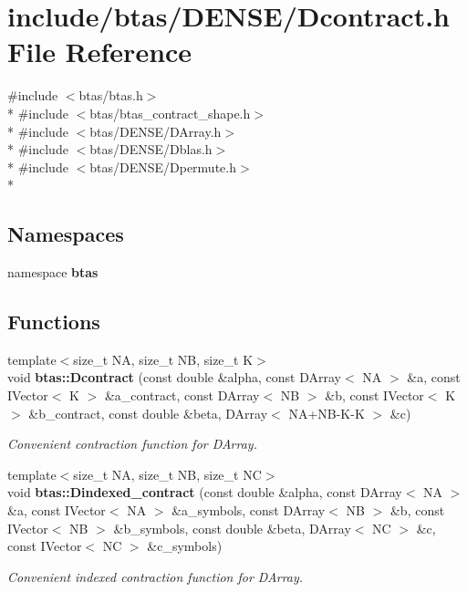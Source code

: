 \section{include/btas/\-D\-E\-N\-S\-E/\-Dcontract.h File Reference}
\label{db/da1/Dcontract_8h}
{\ttfamily \#include $<$btas/btas.\-h$>$}\\*
{\ttfamily \#include $<$btas/btas\-\_\-contract\-\_\-shape.\-h$>$}\\*
{\ttfamily \#include $<$btas/\-D\-E\-N\-S\-E/\-D\-Array.\-h$>$}\\*
{\ttfamily \#include $<$btas/\-D\-E\-N\-S\-E/\-Dblas.\-h$>$}\\*
{\ttfamily \#include $<$btas/\-D\-E\-N\-S\-E/\-Dpermute.\-h$>$}\\*
\subsection*{Namespaces}
\begin{DoxyCompactItemize}
\item 
namespace {\bf btas}
\end{DoxyCompactItemize}
\subsection*{Functions}
\begin{DoxyCompactItemize}
\item 
{\footnotesize template$<$size\-\_\-t N\-A, size\-\_\-t N\-B, size\-\_\-t K$>$ }\\void {\bf btas\-::\-Dcontract} (const double \&alpha, const D\-Array$<$ N\-A $>$ \&a, const I\-Vector$<$ K $>$ \&a\-\_\-contract, const D\-Array$<$ N\-B $>$ \&b, const I\-Vector$<$ K $>$ \&b\-\_\-contract, const double \&beta, D\-Array$<$ N\-A+N\-B-\/K-\/K $>$ \&c)
\begin{DoxyCompactList}\small\item\em Convenient contraction function for D\-Array. \end{DoxyCompactList}\item 
{\footnotesize template$<$size\-\_\-t N\-A, size\-\_\-t N\-B, size\-\_\-t N\-C$>$ }\\void {\bf btas\-::\-Dindexed\-\_\-contract} (const double \&alpha, const D\-Array$<$ N\-A $>$ \&a, const I\-Vector$<$ N\-A $>$ \&a\-\_\-symbols, const D\-Array$<$ N\-B $>$ \&b, const I\-Vector$<$ N\-B $>$ \&b\-\_\-symbols, const double \&beta, D\-Array$<$ N\-C $>$ \&c, const I\-Vector$<$ N\-C $>$ \&c\-\_\-symbols)
\begin{DoxyCompactList}\small\item\em Convenient indexed contraction function for D\-Array. \end{DoxyCompactList}\end{DoxyCompactItemize}
